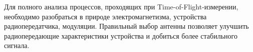 Для полного анализа процессов, проходящих при Time-of-Flight-измерении, необходимо разобраться в природе электромагнетизма, устройства радиопередатчика, модуляции. Правильный выбор антенны позволяет улучшить радиопередающие характеристики устройства и добиться более стабильного сигнала.
